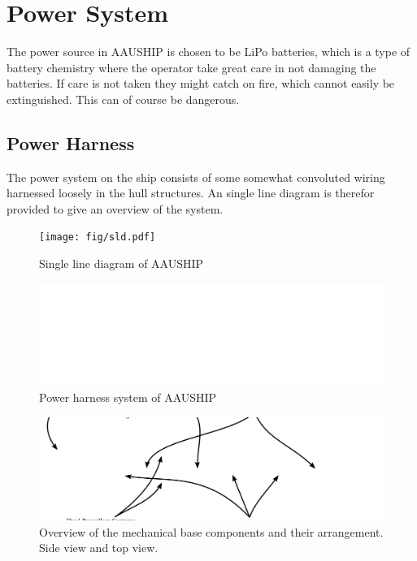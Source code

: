 \section{Power System}

The power source in AAUSHIP is chosen to be LiPo batteries, which is
a type of battery chemistry where the operator take great care in not damaging
the batteries. If care is not taken they might catch on fire, which
cannot easily be extinguished. This can of course be dangerous.

\subsection{Power Harness}
The power system on the ship consists of some somewhat convoluted
wiring harnessed loosely in the hull structures. An single line
diagram is therefor provided to give an overview of the system.

\begin{figure}[htbp]
	\texttt{[image: fig/sld.pdf]}
	\caption{Single line diagram of AAUSHIP}
	\label{fig:sld}
\end{figure}

\begin{figure}[htbp]
	\includegraphics[width=\textwidth]{fig/harness}
	\caption{Power harness system of AAUSHIP}
	\label{fig:harness}
\end{figure}

\begin{figure}[htbp]
	\includegraphics[width=\textwidth]{fig/mechanical}
	\caption{Overview of the mechanical base components and their
	arrangement. Side view and top view.}
	\label{fig:mechanical}
\end{figure}

